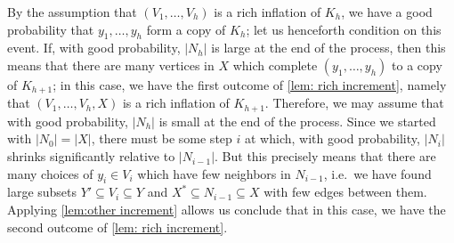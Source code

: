 \documentclass[11pt]{article}
\numberwithin{equation}{section}
\theoremstyle{plain}
\theoremstyle{remark}
\newcommand\ab[1]{\lvert #1 \rvert}
\begin{document}
By the assumption that $(V_1,\dots,V_h)$ is a rich inflation of $K_h$, we have a good probability that $y_1,\dots,y_h$ form a copy of $K_h$; let us henceforth condition on this event. If, with good probability, $\ab{N_h}$ is large at the end of the process, then this means that there are many vertices in $X$ which complete $(y_1,\dots,y_h)$ to a copy of $K_{h+1}$; in this case, we have the first outcome of \cref{lem: rich increment}, namely that $(V_1,\dots,V_h,X)$ is a rich inflation of $K_{h+1}$. Therefore, we may assume that with good probability, $\ab{N_h}$ is small at the end of the process. Since we started with $\ab{N_0}=\ab X$, there must be some step $i$ at which, with good probability, $\ab{N_i}$ shrinks significantly relative to $\ab{N_{i-1}}$. But this precisely means that there are many choices of $y_i \in V_i$ which have few neighbors in $N_{i-1}$, i.e.\ we have found large subsets $Y' \subseteq V_i\subseteq Y$ and $X^* \subseteq N_{i-1}\subseteq X$ with few edges between them. Applying \cref{lem:other increment} allows us conclude that in this case, we have the second outcome of \cref{lem: rich increment}.
\end{document}
